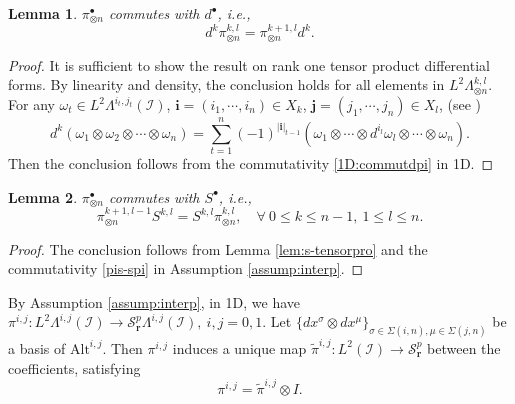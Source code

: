 \documentclass[final]{amsart}%
\newtheorem{lemma}{Lemma}
\newcommand{\0}{\mathaccent23}
\newcommand \alt{\mathrm{Alt}}
\newcommand{\bs}{{\scriptscriptstyle \bullet}}
\newcommand{\br}{\mathbf r}
\begin{document}
\begin{lemma}\label{lem:commut-pi-d1}
$\pi_{\otimes n}^\bs$ commutes with $d^\bs$, i.e., 
\begin{equation}\label{dpi}
    d^k\pi_{\otimes n}^{k, l}=\pi_{\otimes n}^{k+1, l}d^k.
\end{equation}
\end{lemma}

\begin{proof}
It is sufficient to show the result on rank one tensor product differential forms. By linearity and density, the conclusion holds for all elements in $L^2\Lambda_{\otimes n}^{k,l}$.
For any $\omega_{t}\in L^{2}\Lambda^{i_{t}, j_{t}}(\mathcal{I})$, $\bm i=(i_1, \cdots, i_n)\in X_k$,  $\bm j=(j_1, \cdots, j_n)\in X_l$, (see \cite[(31)]{bonizzoni2021h})
\begin{equation*}\label{dpicommute}
d^k(\omega_1 \otimes \omega_2 \otimes \cdots \otimes \omega_n)=\sum\limits_{t=1}^n (-1)^{|\bm{i}|_{t-1}} (\omega_1 \otimes \cdots \otimes d^{i_l}\omega_l \otimes \cdots \otimes \omega_n).
\end{equation*}
Then the conclusion follows from the commutativity \eqref{1D:commutdpi} in 1D.
\end{proof}

\begin{lemma}\label{lem:commut-pi-d2}
$\pi_{\otimes n}^\bs$ commutes with $S^\bs$, i.e., 
\begin{equation}\label{pis}
\pi_{\otimes n}^{k+1, l-1} S^{k, l}=S^{k, l}\pi_{\otimes n}^{k, l}, \quad \forall~ 0\leq k\leq n-1,\ 1\leq l\leq n.
\end{equation}
\end{lemma}

\begin{proof}
The conclusion follows from Lemma \ref{lem:s-tensorpro} and the commutativity \eqref{pis-spi} in Assumption \ref{assump:interp}. 
\end{proof}

By Assumption \ref{assump:interp}, in 1D, we have $\pi^{i, j}: L^2\Lambda^{i, j}(\mathcal{I})\to \mathcal{S}_{\br}^p\Lambda^{i, j}(\mathcal{I}), ~i, j=0, 1$. Let $\{dx^{\sigma}\otimes dx^{\mu}\}_{\sigma\in \Sigma(i,n),\mu\in \Sigma(j,n)}$ be a basis of $\alt^{i, j}$. Then $\pi^{i, j}$ induces a unique map $\tilde{\pi}^{i, j}: L^2(\mathcal{I})\to \mathcal{S}_{\br}^p$ between the coefficients, 
satisfying 
\begin{equation}\label{pi-tilde}
\pi^{i, j}=\tilde{\pi}^{i, j}\otimes I.
\end{equation} 
\end{document}
